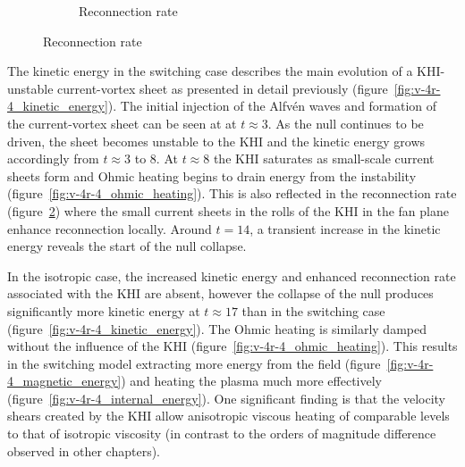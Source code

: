 \begin{figure}[t]
\begin{subfigure}{0.32\textwidth}
    \caption{Reconnection rate}%
    \label{fig:v-4r-4_reconn_rate_over_time}
  \end{subfigure}
\end{figure}

The kinetic energy in the switching case describes the main evolution of a KHI-unstable current-vortex sheet as presented in detail previously (figure~\ref{fig:v-4r-4_kinetic_energy}). The initial injection of the Alfv\'en waves and formation of the current-vortex sheet can be seen at at $t\approx3$. As the null continues to be driven, the sheet becomes unstable to the KHI and the kinetic energy grows accordingly from $t\approx3$ to $8$. At $t\approx 8$ the KHI saturates as small-scale current sheets form and Ohmic heating begins to drain energy from the instability (figure~\ref{fig:v-4r-4_ohmic_heating}). This is also reflected in the reconnection rate (figure~\ref{fig:v-4r-4_reconn_rate_over_time}) where the small current sheets in the rolls of the KHI in the fan plane enhance reconnection locally. Around $t=14$, a transient increase in the kinetic energy reveals the start of the null collapse. 

In the isotropic case, the increased kinetic energy and enhanced reconnection rate associated with the KHI are absent, however the collapse of the null produces significantly more kinetic energy at $t\approx 17$ than in the switching case (figure~\ref{fig:v-4r-4_kinetic_energy}). The Ohmic heating is similarly damped without the influence of the KHI (figure~\ref{fig:v-4r-4_ohmic_heating}). This results in the switching model extracting more energy from the field (figure~\ref{fig:v-4r-4_magnetic_energy}) and heating the plasma much more effectively (figure~\ref{fig:v-4r-4_internal_energy}). One significant finding is that the velocity shears created by the KHI allow anisotropic viscous heating of comparable levels to that of isotropic viscosity (in contrast to the orders of magnitude difference observed in other chapters). 

